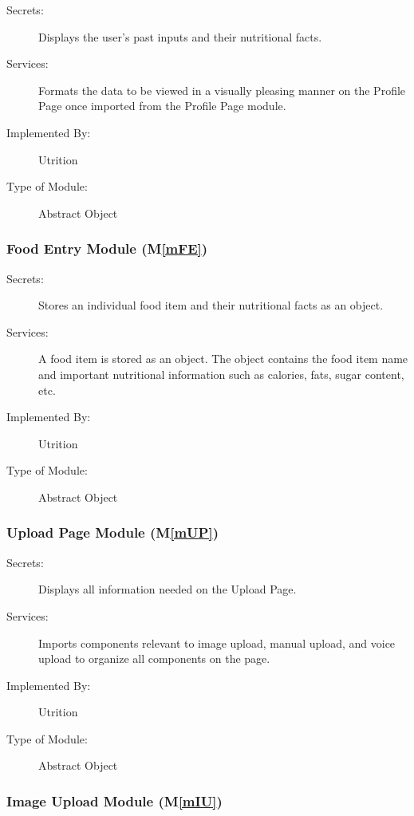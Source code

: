 \documentclass[12pt, titlepage]{article}
\newcommand{\mref}[1]{M\ref{#1}}
\begin{document}
\begin{description}
	\item[Secrets:]Displays the user's past inputs and their nutritional facts.
	\item[Services:]Formats the data to be viewed in a visually pleasing manner 
	on the Profile Page once imported from the Profile Page module.
	\item[Implemented By:] Utrition
	\item[Type of Module:] Abstract Object
	
\end{description}

\subsubsection{Food Entry Module (\mref{mFE})}

\begin{description}
	\item[Secrets:]Stores an individual food item and their nutritional facts as an object.
	\item[Services:]A food item is stored as an object. The object contains the food item name and important nutritional information such as calories, fats, sugar content, etc.
	\item[Implemented By:] Utrition
	\item[Type of Module:] Abstract Object
\end{description}

\subsubsection{Upload Page Module (\mref{mUP})}

\begin{description}
\item[Secrets:]Displays all information needed on the Upload Page.
\item[Services:] Imports components relevant to image upload, manual upload, and voice upload to organize all components on the page. 
\item[Implemented By:] Utrition
\item[Type of Module:] Abstract Object
\end{description}

\subsubsection{Image Upload Module (\mref{mIU})}
\end{document}
